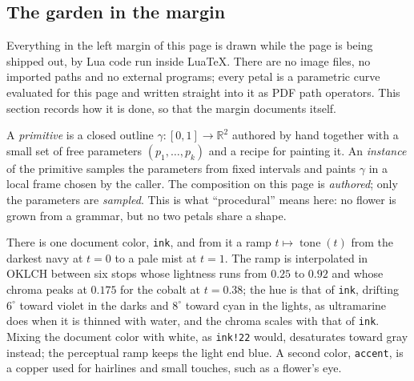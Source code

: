 \setcounter{section}{3}\setcounter{subsection}{1}
\subsection{The garden in the margin}

Everything in the left margin of this page is drawn while the page is being shipped out,
by Lua code run inside Lua\TeX. There are no image files, no imported
paths and no external programs; every petal is a parametric curve evaluated for this page
and written straight into it as PDF path operators. This section records how it is done,
so that the margin documents itself.

\begin{definition}
A \emph{primitive} is a closed outline $\gamma\colon[0,1]\to\mathbb{R}^2$ authored by hand
together with a small set of free parameters $(p_1,\dots,p_k)$ and a recipe for painting
it. An \emph{instance} of the primitive samples the parameters from fixed intervals and
paints $\gamma$ in a local frame chosen by the caller. The composition on this page is
\emph{authored}; only the parameters are \emph{sampled}. This is what ``procedural'' means
here: no flower is grown from a grammar, but no two petals share a shape.
\end{definition}

\begin{construction}[Palette]
There is one document color, \texttt{ink}, and from it a ramp $t\mapsto\operatorname{tone}(t)$
from the darkest navy at $t=0$ to a pale mist at $t=1$. The ramp is interpolated in
OKLCH between six stops whose lightness runs from $0.25$ to $0.92$ and whose chroma peaks
at $0.175$ for the cobalt at $t=0.38$; the hue is that of \texttt{ink}, drifting $6^\circ$
toward violet in the darks and $8^\circ$ toward cyan in the lights, as ultramarine does when
it is thinned with water, and the chroma scales with that of \texttt{ink}. Mixing the
document color with white, as \texttt{ink!22} would, desaturates toward gray instead;
the perceptual ramp keeps the light end blue. A second color, \texttt{accent}, is a copper
used for hairlines and small touches, such as a flower's eye.
\end{construction}

